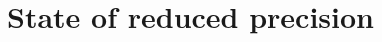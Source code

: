 \chapter{State of reduced precision}
\begin{comment}
This section will discuss:
1. What is reduced precision (RP); discuss mixed precision as a sub-category.
2. Advantages of RP
3. Disavantages of RP.
4. Current field of application (mostly DL).
\end{comment}